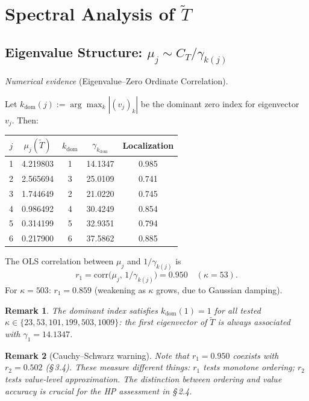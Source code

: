 \documentclass[11pt]{article}
\newtheorem*{remark}{Remark}
\newcommand{\Tt}{\widetilde{T}}
\newcommand{\CT}{C_{T}}
\newcommand{\kdom}{k_{\mathrm{dom}}}
\begin{document}
\section{Spectral Analysis of $\widetilde{T}$}

\subsection{Eigenvalue Structure: $\mu_j \sim \CT/\gamma_{k(j)}$}

\emph{Numerical evidence} (Eigenvalue--Zero Ordinate Correlation).

Let $\kdom(j) := \arg\max_k|(v_j)_k|$ be the dominant zero index
for eigenvector $v_j$. Then:

\begin{center}
\begin{tabular}{ccccc}
\toprule
$j$ & $\mu_j(\Tt)$ & $\kdom$ & $\gamma_{\kdom}$ & Localization \\
\midrule
1 & 4.219803 & 1 & 14.1347 & 0.985 \\
2 & 2.565694 & 3 & 25.0109 & 0.741 \\
3 & 1.744649 & 2 & 21.0220 & 0.745 \\
4 & 0.986492 & 4 & 30.4249 & 0.854 \\
5 & 0.314199 & 5 & 32.9351 & 0.794 \\
6 & 0.217900 & 6 & 37.5862 & 0.885 \\
\bottomrule
\end{tabular}
\end{center}

The OLS correlation between $\mu_j$ and $1/\gamma_{k(j)}$ is
\[
r_1 = \mathrm{corr}\bigl(\mu_j,\,1/\gamma_{k(j)}\bigr) = 0.950
\quad(\kappa=53).
\]
For $\kappa=503$: $r_1 = 0.859$ (weakening as $\kappa$ grows,
due to Gaussian damping).

\begin{remark}
The dominant index satisfies $\kdom(1) = 1$ for all tested
$\kappa\in\{23,53,101,199,503,1009\}$:
the first eigenvector of $\Tt$ is always associated with
$\gamma_1 = 14.1347$.
\end{remark}

\begin{remark}[Cauchy--Schwarz warning]
Note that $r_1 = 0.950$ coexists with $r_2 = 0.502$ (\S\,3.4).
These measure different things: $r_1$ tests monotone ordering;
$r_2$ tests value-level approximation.
The distinction between ordering and value accuracy is crucial for
the HP assessment in \S\,2.4.
\end{remark}
\end{document}

